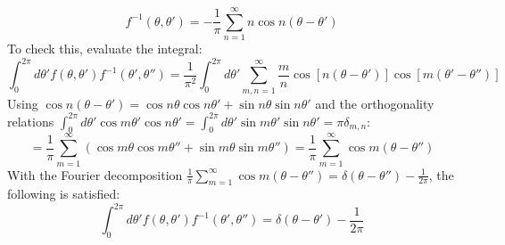 \begin{tcolorbox}[breakable]
			\begin{equation}
				f^{-1}(\theta, \theta') = -\frac{1}{\pi} \sum_{n=1}^\infty n \cos n(\theta - \theta') \label{8.513}
			\end{equation}
			To check this, evaluate the integral:
			\begin{equation}
				\int_0^{2\pi} d\theta' f(\theta, \theta') f^{-1}(\theta', \theta'') = \frac{1}{\pi^2} \int_0^{2\pi} d\theta' \sum_{m,n=1}^\infty \frac{m}{n} \cos [n(\theta - \theta')] \cos [m(\theta' - \theta'')] 
			\end{equation}
			Using $\cos n(\theta - \theta') = \cos n\theta \cos n\theta' + \sin n\theta \sin n\theta'$ and the orthogonality relations $\int_0^{2\pi} d\theta' \cos m\theta' \cos n\theta' = \int_0^{2\pi} d\theta' \sin m\theta' \sin n\theta' = \pi \delta_{m,n}$:
			\begin{equation}
				= \frac{1}{\pi} \sum_{m=1}^\infty ( \cos m\theta \cos m\theta'' + \sin m\theta \sin m\theta'' ) = \frac{1}{\pi} \sum_{m=1}^\infty \cos m(\theta - \theta'') 
			\end{equation}
			With the Fourier decomposition $\frac{1}{\pi} \sum_{m=1}^\infty \cos m(\theta - \theta'') = \delta(\theta - \theta'') - \frac{1}{2\pi}$, the following is satisfied:
			\begin{equation}
				\int_0^{2\pi} d\theta' f(\theta, \theta') f^{-1}(\theta', \theta'')=\delta(\theta-\theta')-\frac{1}{2\pi}\label{8.519}
			\end{equation}
			

\end{tcolorbox}
